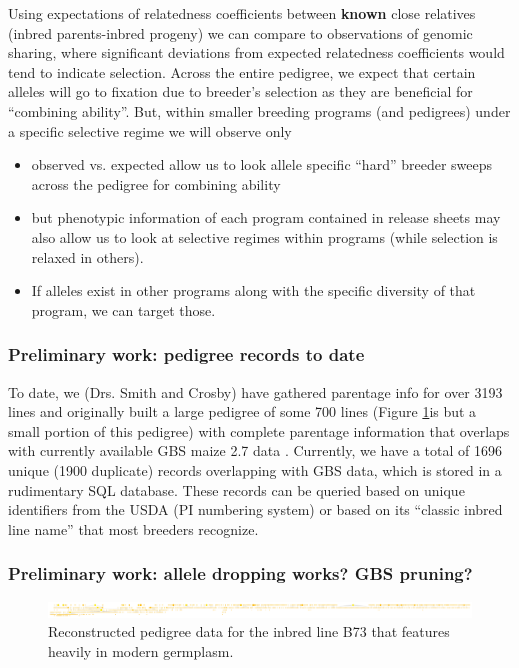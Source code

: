 \documentclass[final,12pt]{article}
\begin{document}
Using expectations of relatedness coefficients between \textbf{known} close relatives (inbred parents-inbred progeny) we can compare to observations of genomic sharing, where significant deviations from expected relatedness coefficients would tend to indicate selection. 
Across the entire pedigree, we expect that certain alleles will go to fixation due to breeder's selection as they are beneficial for ``combining ability''. 
But, within smaller breeding programs (and pedigrees) under a specific selective regime we will observe only 



\begin{itemize}
\item observed vs. expected allow us to look allele specific ``hard'' breeder sweeps across the pedigree for combining ability
\item but phenotypic information of each program contained in release sheets may also allow us to look at selective regimes within programs (while selection is relaxed in others).
\item If alleles exist in other programs along with the specific diversity of that program, we can target those.
\end{itemize}



\subsubsection*{Preliminary work: pedigree records to date}
To date, we (Drs. Smith and Crosby) have gathered parentage info for over 3193 lines and originally built a large pedigree of some 700 lines (Figure \ref{fig:b73isbig}is but a small portion of this pedigree) with complete parentage information that overlaps with currently available GBS maize 2.7 data \citep{Glaubitz:2014eu}. 
Currently, we have a total of 1696 unique (1900 duplicate) records overlapping with GBS data, which is stored in a rudimentary SQL database. 
These records can be queried based on unique identifiers from the USDA (PI numbering system) or based on its ``classic inbred line name'' that most breeders recognize.


\subsubsection*{Preliminary work: allele dropping works? GBS pruning?}


\begin{figure}[ht]
\includegraphics[width=1.0\linewidth]{pedigree_poster.pdf}
\caption{Reconstructed pedigree data for the inbred line B73 that features heavily in modern germplasm.}
\label{fig:b73isbig}
\end{figure}
\end{document}
